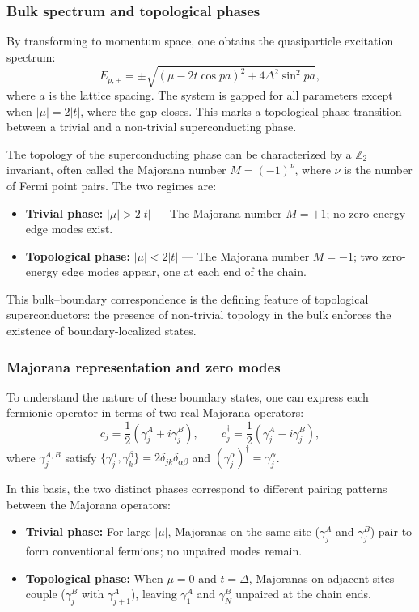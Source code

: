 \documentclass[11pt, letterpaper, titlepage]{article}
\begin{document}
\subsubsection{Bulk spectrum and topological phases}

By transforming to momentum space, one obtains the quasiparticle excitation spectrum:
\begin{equation}
E_{p,\pm} = \pm \sqrt{(\mu - 2t \cos{pa})^2 + 4\Delta^2 \sin^2{pa}},
\end{equation}
where $a$ is the lattice spacing. The system is gapped for all parameters except when $|\mu| = 2|t|$, where the gap closes. This marks a topological phase transition between a trivial and a non-trivial superconducting phase.

The topology of the superconducting phase can be characterized by a $\mathbb{Z}_2$ invariant, often called the Majorana number $M = (-1)^\nu$, where $\nu$ is the number of Fermi point pairs. The two regimes are:
\begin{itemize}
    \item \textbf{Trivial phase:} $|\mu| > 2|t|$ — The Majorana number $M=+1$; no zero-energy edge modes exist.
    \item \textbf{Topological phase:} $|\mu| < 2|t|$ — The Majorana number $M=-1$; two zero-energy edge modes appear, one at each end of the chain.
\end{itemize}
This bulk–boundary correspondence is the defining feature of topological superconductors: the presence of non-trivial topology in the bulk enforces the existence of boundary-localized states.

\subsubsection{Majorana representation and zero modes}

To understand the nature of these boundary states, one can express each fermionic operator in terms of two real Majorana operators:
\begin{equation}
c_j = \frac{1}{2}(\gamma_j^A + i\gamma_j^B), \qquad
c_j^\dagger = \frac{1}{2}(\gamma_j^A - i\gamma_j^B),
\end{equation}
where $\gamma_j^{A,B}$ satisfy $\{\gamma_j^\alpha, \gamma_k^\beta\} = 2\delta_{jk}\delta_{\alpha\beta}$ and $(\gamma_j^\alpha)^\dagger = \gamma_j^\alpha$.

In this basis, the two distinct phases correspond to different pairing patterns between the Majorana operators:
\begin{itemize}
    \item \textbf{Trivial phase:} For large $|\mu|$, Majoranas on the same site ($\gamma_j^A$ and $\gamma_j^B$) pair to form conventional fermions; no unpaired modes remain.
    \item \textbf{Topological phase:} When $\mu=0$ and $t=\Delta$, Majoranas on adjacent sites couple ($\gamma_j^B$ with $\gamma_{j+1}^A$), leaving $\gamma_1^A$ and $\gamma_N^B$ unpaired at the chain ends.
\end{itemize}
\end{document}
